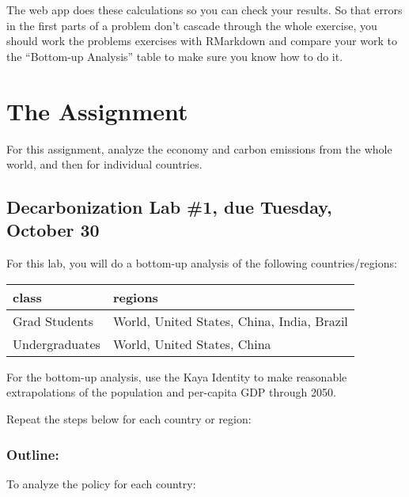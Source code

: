 \documentclass[
]{article}
\begin{document}
The web app does these calculations so you can check your results. So
that errors in the first parts of a problem don't cascade through the
whole exercise, you should work the problems exercises with RMarkdown
and compare your work to the ``Bottom-up Analysis'' table to make sure
you know how to do it.

\hypertarget{the-assignment}{%
\section{The Assignment}\label{the-assignment}}

For this assignment, analyze the economy and carbon emissions from the
whole world, and then for individual countries.

\hypertarget{decarbonization-lab-1-due-tuesday-october-30}{%
\subsection{Decarbonization Lab \#1, due Tuesday, October
30}\label{decarbonization-lab-1-due-tuesday-october-30}}

For this lab, you will do a bottom-up analysis of the following
countries/regions:

\begin{longtable}[]{@{}ll@{}}
\toprule
class & regions\tabularnewline
\midrule
\endhead
Grad Students & World, United States, China, India,
Brazil\tabularnewline
Undergraduates & World, United States, China\tabularnewline
\bottomrule
\end{longtable}

For the bottom-up analysis, use the Kaya Identity to make reasonable
extrapolations of the population and per-capita GDP through 2050.

Repeat the steps below for each country or region:

\hypertarget{outline}{%
\subsubsection{Outline:}\label{outline}}

To analyze the policy for each country:
\end{document}
